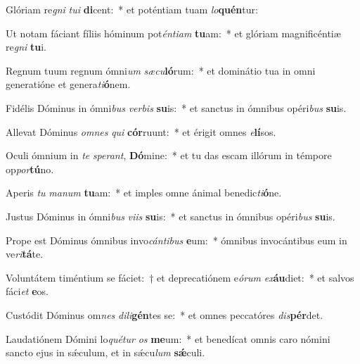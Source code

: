 \item Glóriam re\textit{gni} \textit{tu}\textit{i} \textbf{di}cent:~* et poténtiam tuam \textit{lo}\textbf{quén}tur:
\item Ut notam fáciant fíliis hóminum pot\textit{én}\textit{ti}\textit{am} \textbf{tu}am:~* et glóriam magnificéntiæ re\textit{gni} \textbf{tu}i.
\item Regnum tuum regnum ómni\textit{um} \textit{sæ}\textit{cu}\textbf{ló}rum:~* et dominátio tua in omni generatióne et genera\textit{ti}\textbf{ó}nem.
\item Fidélis Dóminus in ómni\textit{bus} \textit{ver}\textit{bis} \textbf{su}is:~* et sanctus in ómnibus opéri\textit{bus} \textbf{su}is.
\item Allevat Dóminus \textit{om}\textit{nes} \textit{qui} \textbf{cór}ruunt:~* et érigit omnes \textit{e}\textbf{lí}sos.
\item Oculi ómnium in \textit{te} \textit{spe}\textit{rant}, \textbf{Dó}mine:~* et tu das escam illórum in témpore op\textit{por}\textbf{tú}no.
\item Aperis \textit{tu} \textit{ma}\textit{num} \textbf{tu}am:~* et imples omne ánimal benedic\textit{ti}\textbf{ó}ne.
\item Justus Dóminus in ómni\textit{bus} \textit{vi}\textit{is} \textbf{su}is:~* et sanctus in ómnibus opéri\textit{bus} \textbf{su}is.
\item Prope est Dóminus ómnibus invo\textit{cán}\textit{ti}\textit{bus} \textbf{e}um:~* ómnibus invocántibus eum in ve\textit{ri}\textbf{tá}te.
\item Voluntátem timéntium se fáciet:~† et deprecatiónem e\textit{ó}\textit{rum} \textit{ex}\textbf{áu}diet:~* et salvos fáci\textit{et} \textbf{e}os.
\item Custódit Dóminus om\textit{nes} \textit{di}\textit{li}\textbf{gén}tes se:~* et omnes peccatóres \textit{dis}\textbf{pér}det.
\item Laudatiónem Dómini lo\textit{qué}\textit{tur} \textit{os} \textbf{me}um:~* et benedícat omnis caro nómini sancto ejus in sǽculum, et in sǽcu\textit{lum} \textbf{sǽ}culi.
